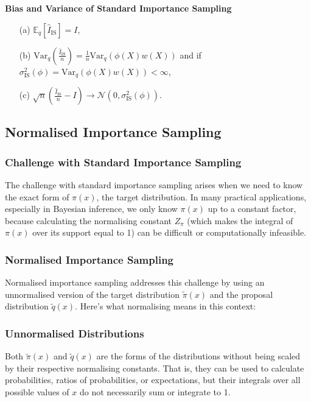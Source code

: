 \documentclass{article}
\begin{document}
\textbf{Bias and Variance of Standard Importance Sampling}
\begin{itemize}
    \item[(a)] \( \mathbb{E}_q \left[ \hat{I}_{\text{IS}} \right] = I \),
    \item[(b)] \( \text{Var}_q \left( \frac{\hat{I}_{\text{IS}}}{n} \right) = \frac{1}{n} \text{Var}_q(\phi(X)w(X)) \) and if \( \sigma^2_{\text{IS}}(\phi) = \text{Var}_q(\phi(X)w(X)) < \infty \),
    \item[(c)] \( \sqrt{n} \left( \frac{\hat{I}_{\text{IS}}}{n} - I \right) \rightarrow \mathcal{N}(0, \sigma^2_{\text{IS}}(\phi)) \).
\end{itemize}

\subsection{Normalised Importance Sampling}

\subsubsection{Challenge with Standard Importance Sampling}

The challenge with standard importance sampling arises when we need to know the exact form of \( \pi(x) \), the target distribution. In many practical applications, especially in Bayesian inference, we only know \( \pi(x) \) up to a constant factor, because calculating the normalising constant \( Z_{\pi} \) (which makes the integral of \( \pi(x) \) over its support equal to 1) can be difficult or computationally infeasible.

\subsubsection{Normalised Importance Sampling}

Normalised importance sampling addresses this challenge by using an unnormalised version of the target distribution \( \tilde{\pi}(x) \) and the proposal distribution \( \tilde{q}(x) \). Here's what normalising means in this context:

\subsubsection{Unnormalised Distributions}

Both \( \tilde{\pi}(x) \) and \( \tilde{q}(x) \) are the forms of the distributions without being scaled by their respective normalising constants. That is, they can be used to calculate probabilities, ratios of probabilities, or expectations, but their integrals over all possible values of \( x \) do not necessarily sum or integrate to 1.
\end{document}
